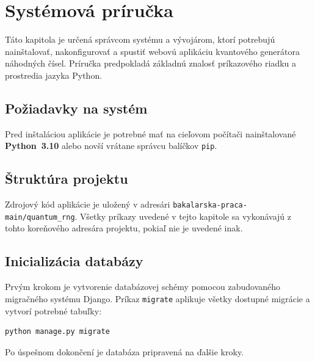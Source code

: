 
\chapter{Systémová príručka}\label{ch:system.manual}

Táto kapitola je určená správcom systému a vývojárom, ktorí potrebujú
nainštalovať, nakonfigurovať a spustiť webovú aplikáciu kvantového generátora
náhodných čísel. Príručka predpokladá základnú znalosť príkazového riadku
a prostredia jazyka Python.

\section{Požiadavky na systém}\label{sec:system.requirements}

Pred inštaláciou aplikácie je potrebné mať na cieľovom počítači nainštalované
\textbf{Python~3.10} alebo novší vrátane správcu balíčkov \texttt{pip}.

\section{Štruktúra projektu}\label{sec:project.structure}

Zdrojový kód aplikácie je uložený v adresári
\texttt{bakalarska-praca-main/quantum\_rng}.
Všetky príkazy uvedené v tejto kapitole sa vykonávajú z tohto koreňového
adresára projektu, pokiaľ nie je uvedené inak.

\section{Inicializácia databázy}\label{sec:db.migrate}

Prvým krokom je vytvorenie databázovej schémy pomocou zabudovaného
migračného systému Django. Príkaz \texttt{migrate} aplikuje všetky dostupné
migrácie a vytvorí potrebné tabuľky:

\begin{verbatim}
python manage.py migrate
\end{verbatim}

Po úspešnom dokončení je databáza pripravená na ďalšie kroky.

